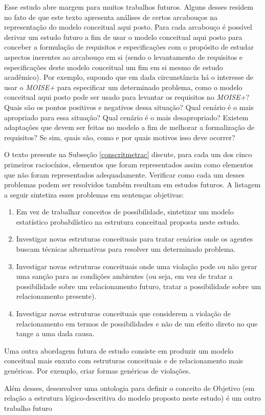 Esse estudo abre margem para muitos trabalhos futuros. Alguns desses residem no fato de que este texto apresenta análises de certos arcabouços na representação do modelo conceitual aqui posto. Para cada arcabouço é possível derivar um estudo futuro a fim de usar o modelo conceitual aqui posto para conceber a formulação de requisitos e especificações com o propósito de estudar aspectos inerentes ao arcabouço em si (sendo o levantamento de requisitos e especificações deste modelo conceitual um fim em si mesmo de estudo acadêmico). Por exemplo, supondo que em dada circunstância há o interesse de usar o \textit{MOISE+} para especificar um determinado problema, como o modelo conceitual aqui posto pode ser usado para levantar os requisitos no \textit{MOISE+}? Quais são os pontos positivos e negativos dessa situação? Qual cenário é o mais apropriado para essa situação? Qual cenário é o mais desapropriado? Existem adaptações que devem ser feitas no modelo a fim de melhorar a formalização de requisitos? Se sim, quais são, como e por quais motivos isso deve ocorrer? 

O texto presente na Subseção \ref{conscritmetrac} discute, para cada um dos cinco primeiros raciocínios, elementos que foram representados assim como elementos que não foram representados adequadamente. Verificar como cada um desses problemas podem ser resolvidos também resultam em estudos futuros. A listagem a seguir sintetiza esses problemas em sentenças objetivas: 

\begin{enumerate}
    \item Em vez de trabalhar conceitos de possibilidade, sintetizar um modelo estatístico probabilístico na estrutura conceitual proposta neste estudo.
    \item Investigar novas estruturas conceituais para tratar cenários onde os agentes buscam técnicas alternativas para resolver um determinado problema. 
    \item Investigar novas estruturas conceituais onde uma violação pode ou não gerar uma sanção para as condições ambientes (ou seja, em vez de tratar a possibilidade sobre um relacionamento futuro, tratar a possibilidade sobre um relacionamento presente).
    \item Investigar novas estruturas conceituais que considerem a violação de relacionamento em termos de possibilidades e não de um efeito direto no que tange a uma dada causa.   
\end{enumerate}

Uma outra abordagem futura de estudo consiste em produzir um modelo conceitual mais enxuto com estruturas conceituais e de relacionamento mais genéricas. Por exemplo, criar formas genéricas de violações.

Além desses, desenvolver uma ontologia para definir o conceito de Objetivo (em relação a estrutura lógico-descritiva do modelo proposto neste estudo) é um outro trabalho futuro